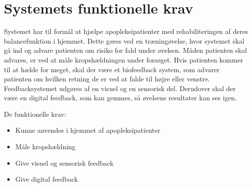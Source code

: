 \section{Systemets funktionelle krav}

Systemet har til formål at hjælpe apopleksipatienter med rehabiliteringen af deres balancefunktion i hjemmet. Dette gøres ved en træningøvelse, hvor systemet skal gå ind og advare patienten om risiko for fald under øvelsen. Måden patienten skal advares, er ved at måle kropshældningen under forsøget. Hvis patienten kommer til at hælde for meget, skal der være et biofeedback system, som advarer patienten om hvilken retning de er ved at falde til højre eller venstre. Feedbacksystemet udgøres af en visuel og en sensorisk del. %
Derudover skal der være en digital feedback, som kan gemmes, så øvelsens resultater kan ses igen. 

De funktionelle krav:
\begin{itemize}
\item Kunne anvendes i hjemmet af apopleksipatienter
\item Måle kropshældning
\item Give visuel og sensorisk feedback
\item Give digital feedback
\end{itemize}